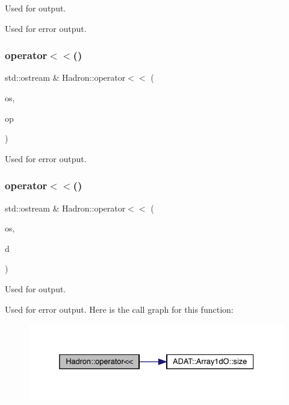 Used for output. 

Used for error output. \mbox{\label{namespaceHadron_a16e2cbe171cccf191439c38f7ce36655}} 
\subsubsection{\texorpdfstring{operator$<$$<$()}{operator<<()}\hspace{0.1cm}{\footnotesize\ttfamily [39/48]}}
{\footnotesize\ttfamily std\+::ostream \& Hadron\+::operator$<$$<$ (\begin{DoxyParamCaption}\item[{std\+::ostream \&}]{os,  }\item[{const \mbox{\hyperlink{structHadron_1_1HadronQuarkLocation__t}{Hadron\+Quark\+Location\+\_\+t}} \&}]{op }\end{DoxyParamCaption})}



Used for error output. 

\mbox{\label{namespaceHadron_a243db37c66ec71b086f54a64d62fa659}} 
\subsubsection{\texorpdfstring{operator$<$$<$()}{operator<<()}\hspace{0.1cm}{\footnotesize\ttfamily [40/48]}}
{\footnotesize\ttfamily std\+::ostream \& Hadron\+::operator$<$$<$ (\begin{DoxyParamCaption}\item[{std\+::ostream \&}]{os,  }\item[{const \mbox{\hyperlink{classADAT_1_1Array1dO}{Array1dO}}$<$ \mbox{\hyperlink{structHadron_1_1KeyHadronNode__t}{Key\+Hadron\+Node\+\_\+t}} $>$ \&}]{d }\end{DoxyParamCaption})}



Used for output. 

Used for error output. Here is the call graph for this function\+:
\nopagebreak
\begin{figure}[H]
\begin{center}
\leavevmode
\includegraphics[width=332pt]{d1/daf/namespaceHadron_a243db37c66ec71b086f54a64d62fa659_cgraph}
\end{center}
\end{figure}
\mbox{\label{namespaceHadron_af9e168289a71f406cf53d10783cc513c}} 
